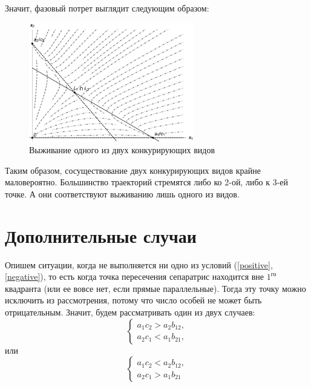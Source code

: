 \documentclass[12pt,a4paper]{article}
\begin{document}
    \pagebreak
    
    Значит, фазовый потрет выглядит следующим образом:
    \begin{figure}[h]
        \centering
        \includegraphics[width=0.64\textwidth]{phase_2.pdf}
        \caption{Выживание одного из двух конкурирующих видов}
        \label{fig:phase_2}
    \end{figure}

    Таким образом, сосуществование двух конкурирующих видов крайне маловероятно. Большинство траекторий стремятся либо ко 2-ой, либо к 3-ей точке. А они соответствуют выживанию лишь одного из видов.

    \section{Дополнительные случаи}
    Опишем ситуации, когда не выполняется ни одно из условий (\ref{positive},\,\ref{negative}), то есть когда точка пересечения сепаратрис находится вне $1^{\text{го}}$ квадранта (или ее вовсе нет, если прямые параллельные). Тогда эту точку можно исключить из рассмотрения, потому что число особей не может быть отрицательным. Значит, будем рассматривать один из двух случаев:
    \begin{equation}
        \label{posneg}
        \begin{cases}
            a_1 c_2 > a_2 b_{12},
            \\
            a_2 c_1 < a_1 b_{21},
        \end{cases}
    \end{equation}
    \noindent или
    \begin{equation}
        \label{negpos}
        \begin{cases}
            a_1 c_2 < a_2 b_{12},
            \\
            a_2 c_1 > a_1 b_{21}
        \end{cases}
    \end{equation}
\end{document}
